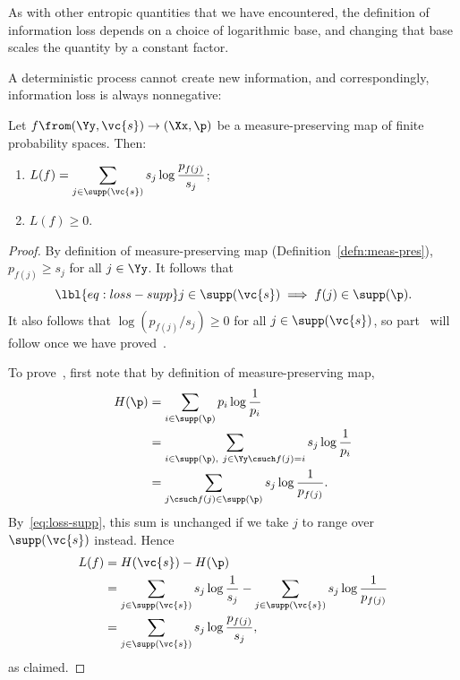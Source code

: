 As with other entropic quantities that we have encountered, the definition
of information loss depends on a choice of logarithmic base, and
changing that base scales the quantity by a constant factor.

A deterministic%
%
% 
process cannot create new information, and correspondingly,
information loss is always nonnegative:%
%

\begin{lemma}
Let $f \from (\Yy, \vc{s}) \to (\Xx, \p)$ be a measure-preserving map of finite
probability spaces.  Then:
% 
\begin{enumerate}
\item
{}
% 
$\displaystyle 
L(f)
=
\sum_{j \in \supp(\vc{s})} s_j \log \frac{p_{f(j)}}{s_j}$;

\item
{}
$L(f) \geq 0$.
\end{enumerate}
\end{lemma}

\begin{proof}
By definition of measure-preserving map
(Definition~\ref{defn:meas-pres}), $p_{f(j)} \geq s_j$ for all $j \in \Yy$.
It follows that 
% 
\begin{equation}
\lbl{eq:loss-supp}
j \in \supp(\vc{s}) \implies f(j) \in \supp(\p).
\end{equation}
% 
It also follows that $\log(p_{f(j)}/s_j) \geq 0$ for all $j \in
\supp(\vc{s})$, so part~ will follow once
we have proved~.

To prove~, first note that by definition of
measure-preserving map,
% 
\begin{align*}
H(\p)   &
=
\sum_{i \in \supp(\p)} p_i \log \frac{1}{p_i}   \\
&
=
\sum_{i \in \supp(\p), \ j \in \Yy\csuch f(j) = i}
s_j \log \frac{1}{p_i}  \\
&
=
\sum_{j \csuch f(j) \in \supp(\p)} s_j \log \frac{1}{p_{f(j)}}.
\end{align*}
% 
By~\eqref{eq:loss-supp}, this sum is unchanged if we take $j$ to range over
$\supp(\vc{s})$ instead.  Hence
% 
\begin{align*}
L(f)    &
=
H(\vc{s}) - H(\p)       \\
&
=
\sum_{j \in \supp(\vc{s})} s_j \log \frac{1}{s_j}
- \sum_{j \in \supp(\vc{s})} s_j \log \frac{1}{p_{f(j)}}        \\
&
=
\sum_{j \in \supp(\vc{s})} s_j \log \frac{p_{f(j)}}{s_j},
\end{align*}
% 
as claimed.
\end{proof}


